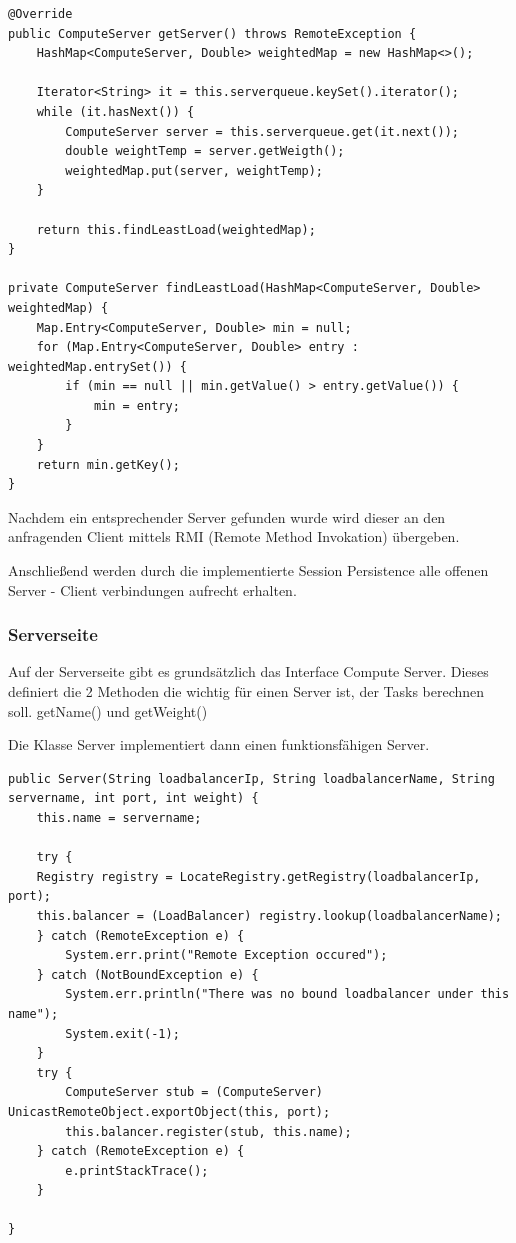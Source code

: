 \begin{lstlisting}[style=Java, caption=Weighted Round Robin Lastberechnnug]	
@Override
public ComputeServer getServer() throws RemoteException {
	HashMap<ComputeServer, Double> weightedMap = new HashMap<>();
	
	Iterator<String> it = this.serverqueue.keySet().iterator();
	while (it.hasNext()) {
		ComputeServer server = this.serverqueue.get(it.next());
		double weightTemp = server.getWeigth();
		weightedMap.put(server, weightTemp);
	}
	
	return this.findLeastLoad(weightedMap);
}

private ComputeServer findLeastLoad(HashMap<ComputeServer, Double> weightedMap) {
	Map.Entry<ComputeServer, Double> min = null;
	for (Map.Entry<ComputeServer, Double> entry : weightedMap.entrySet()) {
		if (min == null || min.getValue() > entry.getValue()) {
			min = entry;
		}
	}
	return min.getKey();
}
\end{lstlisting}

Nachdem ein entsprechender Server gefunden wurde wird dieser an den anfragenden Client mittels RMI (Remote Method Invokation) übergeben.

Anschließend werden durch die implementierte Session Persistence alle offenen Server - Client verbindungen aufrecht erhalten.

\clearpage

\subsubsection{Serverseite}
Auf der Serverseite gibt es grundsätzlich das Interface Compute Server. Dieses definiert die 2 Methoden die wichtig für einen Server ist, der Tasks berechnen soll. 
getName() und getWeight()

Die Klasse Server implementiert dann einen funktionsfähigen Server. 

\begin{lstlisting}[style=Java, caption=Server Implementierung]	
public Server(String loadbalancerIp, String loadbalancerName, String servername, int port, int weight) {
	this.name = servername;

	try {
	Registry registry = LocateRegistry.getRegistry(loadbalancerIp, port);
	this.balancer = (LoadBalancer) registry.lookup(loadbalancerName);
	} catch (RemoteException e) {
		System.err.print("Remote Exception occured");
	} catch (NotBoundException e) {
		System.err.println("There was no bound loadbalancer under this name");
		System.exit(-1);
	}
	try {
		ComputeServer stub = (ComputeServer) UnicastRemoteObject.exportObject(this, port);
		this.balancer.register(stub, this.name);
	} catch (RemoteException e) {
		e.printStackTrace();
	}

}
\end{lstlisting}

